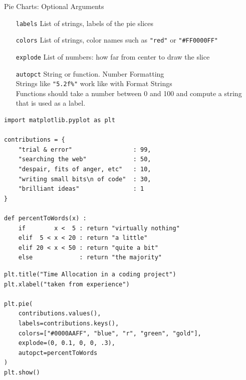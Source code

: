\begin{frame}{Pie Charts: Optional Arguments}
%
%
\begin{center}
\begin{minipage}{.9\linewidth}
\begin{itemize}
\item[\texttt{labels}] List of strings, labels of the pie slices
\item[\texttt{colors}] List of strings, color names such as \texttt{"red"} or \texttt{"\#FF0000FF"}
\item[\texttt{explode}] List of numbers: how far from center to draw the slice
\item[\texttt{autopct}] String or function. Number Formatting\\
	Strings like \texttt{"5.2f\%"} work like with Format Strings\\
	Functions should take a number between 0 and 100 and compute a string that is used as a label.
\end{itemize}
\end{minipage}
\end{center}
%
\end{frame}


\begin{frame}[fragile]
%
\begin{codebox}
\begin{verbatim}
import matplotlib.pyplot as plt

contributions = {
    "trial & error"                 : 99,
    "searching the web"             : 50,
    "despair, fits of anger, etc"   : 10,
    "writing small bits\n of code"  : 30,
    "brilliant ideas"               : 1
}

def percentToWords(x) :
    if        x <  5 : return "virtually nothing"
    elif  5 < x < 20 : return "a little"
    elif 20 < x < 50 : return "quite a bit"
    else             : return "the majority"
\end{verbatim}
\end{codebox}
%
\end{frame}


\begin{frame}[fragile]
%
\begin{codebox}[... continued]
\begin{verbatim}
plt.title("Time Allocation in a coding project")
plt.xlabel("taken from experience")

plt.pie(
    contributions.values(),
    labels=contributions.keys(),
    colors=["#0000AAFF", "blue", "r", "green", "gold"],
    explode=(0, 0.1, 0, 0, .3),
    autopct=percentToWords
)
plt.show()
\end{verbatim}
\end{codebox}
%
\end{frame}

